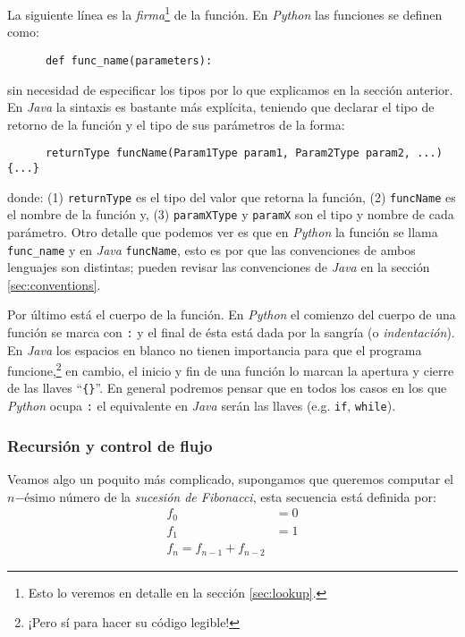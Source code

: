     La siguiente línea es la \textit{firma}\footnote{Esto lo veremos en detalle en la sección 
    \ref{sec:lookup}.} de la función.
    En \textit{Python} las funciones se definen como:
    \begin{verbatim}
      def func_name(parameters):
    \end{verbatim}
    sin necesidad de especificar los tipos por lo que explicamos en la sección anterior.
    En \textit{Java} la sintaxis es bastante más explícita, teniendo que declarar el tipo de retorno de
    la función y el tipo de sus parámetros de la  forma:
    \begin{verbatim}
      returnType funcName(Param1Type param1, Param2Type param2, ...) {...}
    \end{verbatim}
    donde: (1) \texttt{returnType} es el tipo del valor que retorna la función, (2) \texttt{funcName} es
    el nombre de la función y, (3) \texttt{paramXType} y \texttt{paramX} son el tipo y nombre de cada 
    parámetro.
    Otro detalle que podemos ver es que en \textit{Python} la función se llama \texttt{func\_name} y en 
    \textit{Java} \texttt{funcName}, esto es por que las convenciones de ambos lenguajes son 
    distintas; pueden revisar las convenciones de \textit{Java} en la sección \ref{sec:conventions}.
    
    Por último está el cuerpo de la función. 
    En \textit{Python} el comienzo del cuerpo de una función se marca con \texttt{:} y el final de 
    ésta está dada por la sangría (o \textit{indentación}).
    En \textit{Java} los espacios en blanco no tienen importancia para que el programa 
    funcione,\footnote{¡Pero sí para hacer su código legible!} en cambio, el inicio y fin de una 
    función lo marcan la apertura y cierre de las llaves \enquote{\texttt{\{\}}}.
    En general podremos pensar que en todos los casos en los que \textit{Python} ocupa \texttt{:} el
    equivalente en \textit{Java} serán las llaves (e.g. \texttt{if}, \texttt{while}).

  \subsubsection{Recursión y control de flujo}
    Veamos algo un poquito más complicado, supongamos que queremos computar el \(n\mathrm{-ésimo}\)
    número de la \textit{sucesión de Fibonacci}, esta secuencia está definida por:
    \[
      \begin{align}
        f_0 &= 0  \\
        f_1 &= 1  \\
        f_n = f_{n - 1} + f_{n - 2}
      \end{align}
    \]

